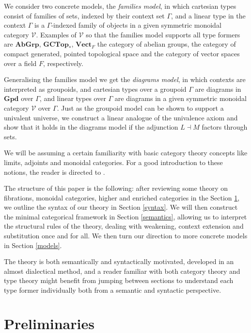 We consider two concrete models, the \textit{families model}, in which cartesian types consist of families of sets, indexed by their context set $\Gamma$, and a linear type in the context $\Gamma$ is a $\Gamma$-indexed family of objects in a given symmetric monoidal category $\mathcal{V}$. Examples of $\mathcal{V}$ so that the families model supports all type formers are $\mathbf{AbGrp}$, $\mathbf{GCTop}_*$, $\mathbf{Vect}_F$ the category of abelian groups, the category of compact generated, pointed topological space and the category of vector spaces over a field $F$, respectively.

Generalising the families model we get the \textit{diagrams model}, in which contexts are interpreted as groupoids, and cartesian types over a groupoid $\Gamma$ are diagrams in $\mathbf{Gpd}$ over $\Gamma$, and linear types over $\Gamma$ are diagrams in a given symmetric monoidal category $\mathcal{V}$ over $\Gamma$. Just as the groupoid model \cite{hofmann1998} can be shown to support a univalent universe, we construct a linear analogue of the univalence axiom and show that it holds in the diagrams model if the adjunction $L \dashv M$ factors through sets.

We will be assuming a certain familiarity with basic category theory concepts like limits, adjoints and monoidal categories. For a good introduction to these notions, the reader is directed to \cite{awodey2010category}.

The structure of this paper is the following: after reviewing some theory on fibrations, monoidal categories, higher and enriched categories in the Section \ref{prelim}, we outline the syntax of our theory in Section \ref{syntax}. We will then construct the minimal categorical framework in Section \ref{semantics}, allowing us to interpret the structural rules of the theory, dealing with weakening, context extension and substitution once and for all. We then turn our direction to more concrete models in Section \ref{models}.

The theory is both semantically and syntactically motivated, developed in an almost dialectical method, and a reader familiar with both category theory and type theory might benefit from jumping between sections to understand each type former individually both from a semantic and syntactic perspective.
\section{Preliminaries}\label{prelim}
